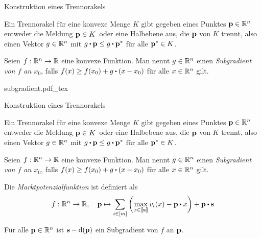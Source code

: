 \begin{frame}[t]{Konstruktion eines Trennorakels}
\pause \begin{definition}[Trennorakel]
	Ein Trennorakel für eine konvexe Menge $K$ gibt gegeben eines Punktes $\mathbf{p}\in\mathbb{R}^n$ entweder die Meldung \glqq $\mathbf{p}\in K$\grqq\ oder eine Halbebene aus, die $\mathbf{p}$ von $K$ trennt, also einen Vektor $g\in\mathbb{R}^n$ mit $g\bcdot \fp \leq g \bcdot \fp^*$ für alle $\mathbf{p}^*\in K$.
\end{definition}
\vspace{-0.4em}
\pause\begin{definition}[Subgradient]
	Seien $f:\mathbb{R}^n \rightarrow \mathbb{R}$ eine konvexe Funktion.
	Man nennt $g\in\mathbb{R}^n$ einen \emph{Subgradient von $f$ an $x_0$}, falls $f(x)\geq f(x_0) + g \bcdot (x - x_0)$ für alle $x\in\mathbb{R}^n$ gilt.
\end{definition}
\vspace{-0.4em}
\centering
\def\svgwidth{0.8\columnwidth}
	{subgradient.pdf_tex}
\end{frame}

\begin{frame}[t]{Konstruktion eines Trennorakels}
\addtocounter{theorem}{-2}
\begin{definition}[Trennorakel]
	Ein Trennorakel für eine konvexe Menge $K$ gibt gegeben eines Punktes $\mathbf{p}\in\mathbb{R}^n$ entweder die Meldung \glqq $\mathbf{p}\in K$\grqq\ oder eine Halbebene aus, die $\mathbf{p}$ von $K$ trennt, also einen Vektor $g\in\mathbb{R}^n$ mit $g\bcdot \fp \leq g \bcdot \fp^*$ für alle $\mathbf{p}^*\in K$.
\end{definition}
\vspace{-0.4em}
\begin{definition}[Subgradient]
	Seien $f:\mathbb{R}^n \rightarrow \mathbb{R}$ eine konvexe Funktion.
	Man nennt $g\in\mathbb{R}^n$ einen \emph{Subgradient von $f$ an $x_0$}, falls $f(x)\geq f(x_0) + g \bcdot (x - x_0)$ für alle $x\in\mathbb{R}^n$ gilt.
\end{definition}
\vspace{-0.4em}
\begin{definition}[Marktpotenzialfunktion]
Die \emph{Marktpotenzialfunktion} ist definiert als
\[ f: \R^n \rightarrow \R, \quad \fp \mapsto \sum_{i\in\first{m}} \left( 
\max_{x\in\ffirst{\fs}} v_i(x) - \fp \bcdot x
\right) + \fp\bcdot \fs \]
\end{definition}
\vspace{-0.4em}
\pause \begin{lemma}
Für alle $\mathbf{p}\in\mathbb{R}^n$ ist $\mathbf{s} - \operatorname{d}(\mathbf{p})$ ein Subgradient von $f$ an $\mathbf{p}$.
\end{lemma}
\end{frame}

